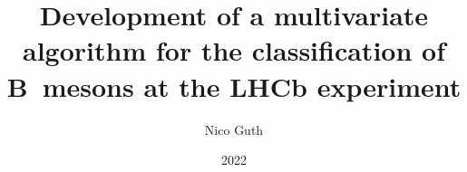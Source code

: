 \documentclass[
  tucolor,       %
  BCOR=12mm,     %
  parskip=half,  %
  open=any,      %
  cleardoublepage=plain,  %
]{tudothesis}
\author{Nico Guth}
\title{Development of a multivariate algorithm for the classification of B~mesons at the LHCb experiment}
\date{2022}
\begin{document}
\begin{linenumbers}
\frontmatter
\maketitle

\makecorrectorpage


\tableofcontents

\mainmatter %






%

\backmatter
\printbibliography %


\cleardoublepage

\end{linenumbers}
\end{document}
